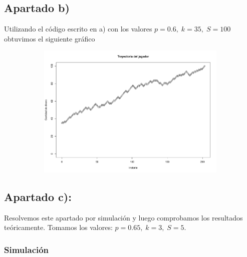 \documentclass[11pt]{article}
\begin{document}

\subsection*{Apartado b)}

Utilizando el código escrito en a) con los valores $p = 0.6, \; k = 35, \; S = 100$ obtuvimos el
siguiente gráfico

\begin{figure}[h!]
  \begin{center}
    \begin{subfigure}[b]{\linewidth}
      \includegraphics[width=\linewidth]{trayectoriaGamblers.pdf}
    \end{subfigure}
  \end{center}
\end{figure}


\subsection*{Apartado c):}

Resolvemos este apartado por simulación y luego comprobamos los resultados teóricamente.
Tomamos los valores: $p = 0.65, \; k = 3, \; S = 5 $.

\subsubsection*{Simulación}
\end{document}
